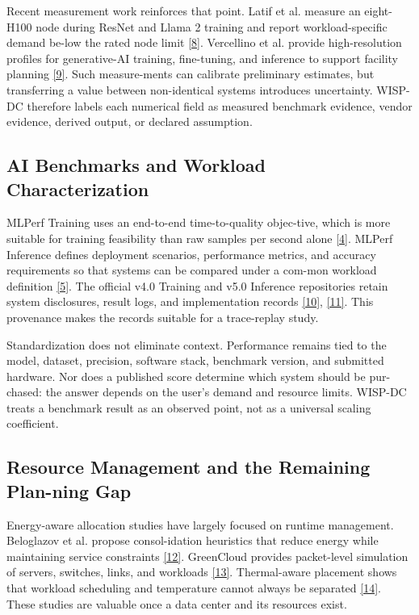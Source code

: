 \documentclass[final,3p,12pt,nopreprintline]{elsarticle}
\begin{document}
Recent measurement work reinforces that point. Latif et al. measure an eight-H100 node during ResNet and Llama 2 training and report workload-specific demand be-low the rated node limit \hyperref[ref:8]{[8]}. Vercellino et al. provide high-resolution profiles for generative-AI training, fine-tuning, and inference to support facility planning \hyperref[ref:9]{[9]}. Such measure-ments can calibrate preliminary estimates, but transferring a value between non-identical systems introduces uncertainty. WISP-DC therefore labels each numerical field as measured benchmark evidence, vendor evidence, derived output, or declared assumption.


\subsection{AI Benchmarks and Workload Characterization}


MLPerf Training uses an end-to-end time-to-quality objec-tive, which is more suitable for training feasibility than raw samples per second alone \hyperref[ref:4]{[4]}. MLPerf Inference defines deployment scenarios, performance metrics, and accuracy requirements so that systems can be compared under a com-mon workload definition \hyperref[ref:5]{[5]}. The official v4.0 Training and v5.0 Inference repositories retain system disclosures, result logs, and implementation records \hyperref[ref:10]{[10]}, \hyperref[ref:11]{[11]}. This provenance makes the records suitable for a trace-replay study.


Standardization does not eliminate context. Performance remains tied to the model, dataset, precision, software stack, benchmark version, and submitted hardware. Nor does a published score determine which system should be pur-chased: the answer depends on the user’s demand and resource limits. WISP-DC treats a benchmark result as an observed point, not as a universal scaling coefficient.


\subsection{Resource Management and the Remaining Plan-ning Gap}


Energy-aware allocation studies have largely focused on runtime management. Beloglazov et al. propose consol-idation heuristics that reduce energy while maintaining service constraints \hyperref[ref:12]{[12]}. GreenCloud provides packet-level simulation of servers, switches, links, and workloads \hyperref[ref:13]{[13]}. Thermal-aware placement shows that workload scheduling and temperature cannot always be separated \hyperref[ref:14]{[14]}. These studies are valuable once a data center and its resources exist.
\end{document}
